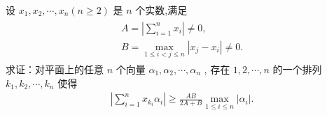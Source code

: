 \begin{example}
	设 $x_1, x_2, \cdots, x_n(n \geqslant 2)$ 是 $n$ 个实数,满足
	\begin{align*}
		\begin{gathered}
			A=\left|\sum_{i=1}^n x_i\right| \neq 0, \\
			B=\max _{1 \leq i<j \leqslant n}\left|x_j-x_i\right| \neq 0 .
		\end{gathered}
	\end{align*}
	求证：对平面上的任意 $n$ 个向量 $\alpha_1, \alpha_2, \cdots, \alpha_n$ , 存在 $1,2, \cdots, n$ 的一个排列 $k_1, k_2, \cdots, k_n$ 使得
	\begin{align*}
		\left|\sum_{i=1}^n x_{k_i} \alpha_i\right| \geqslant \frac{A B}{2 A+B} \max _{1 \leqslant i \leqslant n}\left|\alpha_i\right| .
	\end{align*}
\end{example}
